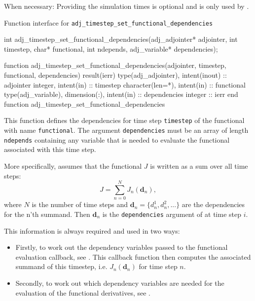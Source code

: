When necessary: Providing the simulation times is optional and is only used by .

\begin{boxwithtitle}{Function interface for \texttt{adj_timestep_set_functional_dependencies}}
\begin{minipage}{\columnwidth}
\begin{ccode}
  int adj_timestep_set_functional_dependencies(adj_adjointer* adjointer, 
                   int timestep, char* functional, int ndepends, 
                   adj_variable* dependencies);
\end{ccode}
\begin{fortrancode}
  function adj_timestep_set_functional_dependencies(adjointer, timestep, 
                                  functional, dependencies) result(ierr)
    type(adj_adjointer), intent(inout) :: adjointer
    integer, intent(in) :: timestep
    character(len=*), intent(in) :: functional
    type(adj_variable), dimension(:), intent(in) :: dependencies
    integer :: ierr
  end function adj_timestep_set_functional_dependencies
\end{fortrancode}
\end{minipage}
\end{boxwithtitle}

This function defines the dependencies for time step \texttt{timestep} of the functional with name \texttt{functional}.
The argument \texttt{dependencies} must be an array of length \texttt{ndepends} containing any variable that is needed to evaluate the functional associated with this time step.

More specifically, \libadjoint assumes that the functional $J$ is written as a sum over all time steps:
\begin{equation}
J = \sum_{n=0}^N J_n(\mathbf d_n),
\label{eq:functional_as_sum}
\end{equation}
where $N$ is the number of time steps and $\mathbf d_n=\{d_n^1, d_n^2, ...\}$ are the dependencies for the n'th summand.
Then $\mathbf d_n$ is the \texttt{dependencies} argument of   at time step $i$.

This information is always required and used in two ways: 
\begin{itemize}
\item Firstly, to work out the dependency variables passed to the functional evaluation callback, see .
This callback function then computes the associated summand of this timestep, i.e. $J_n(\mathbf d_n)$ for time step $n$.
\item Secondly, to work out which dependency variables are needed for the evaluation of the functional derivatives, see .
\end{itemize}

